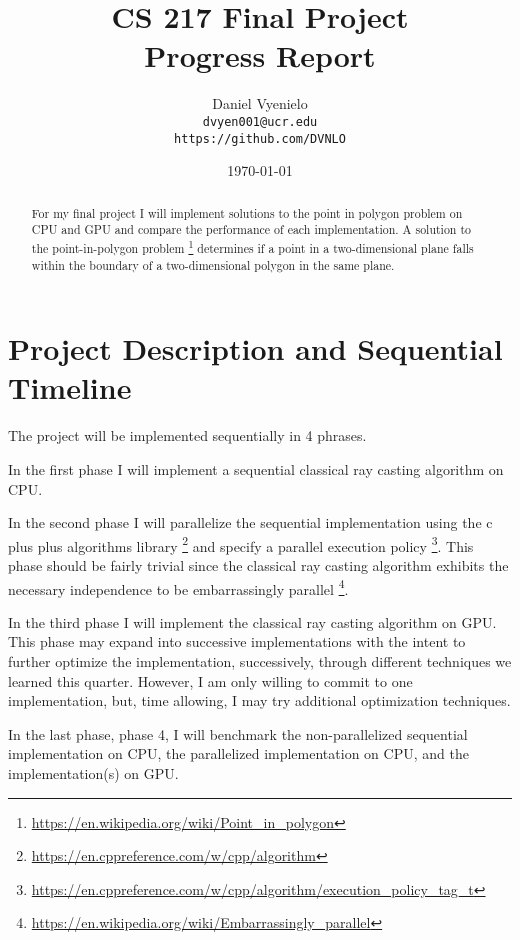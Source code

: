 \documentclass{article}
\begin{document}
\title{CS 217 Final Project \\ Progress Report }
\author{Daniel Vyenielo\\
		\texttt{dvyen001@ucr.edu}\\
		\texttt{https://github.com/DVNLO}}
\date{\today}
\maketitle

\begin{abstract}
For my final project I will implement solutions to the point in polygon problem on CPU and GPU and compare the performance of each implementation. A solution to the point-in-polygon problem \footnote{\url{https://en.wikipedia.org/wiki/Point_in_polygon}} determines if a point in a two-dimensional plane falls within the boundary of a two-dimensional polygon in the same plane.
\end{abstract}

\section{Project Description and Sequential Timeline}
The project will be implemented sequentially in 4 phrases. 

In the first phase I will implement a sequential classical ray casting algorithm on CPU. 

In the second phase I will parallelize the sequential implementation using the c plus plus algorithms library \footnote{\url{https://en.cppreference.com/w/cpp/algorithm}} and specify a parallel execution policy \footnote{\url{https://en.cppreference.com/w/cpp/algorithm/execution_policy_tag_t}}. This phase should be fairly trivial since the classical ray casting algorithm exhibits the necessary independence to be embarrassingly parallel \footnote{\url{https://en.wikipedia.org/wiki/Embarrassingly_parallel}}.

In the third phase I will implement the classical ray casting algorithm on GPU. This phase may expand into successive implementations with the intent to further optimize the implementation, successively, through different techniques we learned this quarter. However, I am only willing to commit to one implementation, but, time allowing, I may try additional optimization techniques.

In the last phase, phase 4, I will benchmark the non-parallelized sequential implementation on CPU, the parallelized implementation on CPU, and the implementation(s) on GPU. 
\end{document}
